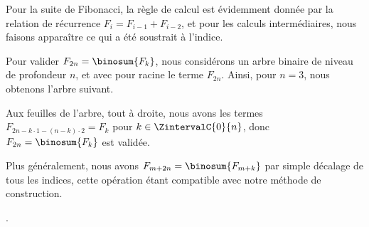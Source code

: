 Pour la suite de Fibonacci, la règle de calcul est évidemment donnée par la relation de récurrence $F_{i} = F_{i-1} + F_{i-2}$, et pour les calculs intermédiaires, nous faisons apparaître ce qui a été soustrait à l'indice.

%
            {\intertree}{}

Pour valider $F_{2n} = \binosum{F_k}$, nous considérons un arbre binaire de niveau de profondeur $n$, et avec pour racine le terme $F_{2n}$. Ainsi, pour $n=3$, nous obtenons l'arbre suivant.


Aux feuilles de l'arbre, tout à droite, nous avons les termes 
$F_{2n - k\cdot1 - (n-k)\cdot2} = F_k$
pour $k \in \ZintervalC{0}{n}$,
donc
$F_{2n} = \binosum{F_k}$ est validée.

\begin{remark}
	Plus généralement, nous avons
	$F_{m+2n}= \binosum{F_{m+k}}$
	par simple décalage de tous les indices, cette opération étant compatible avec notre méthode de construction.
\end{remark}

.